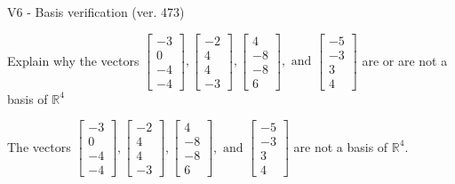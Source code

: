 \begin{exercise}
  \begin{exerciseTitle}V6 - Basis verification (ver. 473)\end{exerciseTitle}
  \begin{exerciseStatement}
    Explain why the vectors \(\left[\begin{array}{r}
-3 \\
0 \\
-4 \\
-4
\end{array}\right] , \left[\begin{array}{r}
-2 \\
4 \\
4 \\
-3
\end{array}\right] , \left[\begin{array}{r}
4 \\
-8 \\
-8 \\
6
\end{array}\right] , \text{ and } \left[\begin{array}{r}
-5 \\
-3 \\
3 \\
4
\end{array}\right]\) are or are not a basis of \(\mathbb{R}^4\)	


  \end{exerciseStatement}
  \begin{exerciseAnswer}
   The vectors \(\left[\begin{array}{r}
-3 \\
0 \\
-4 \\
-4
\end{array}\right] , \left[\begin{array}{r}
-2 \\
4 \\
4 \\
-3
\end{array}\right] , \left[\begin{array}{r}
4 \\
-8 \\
-8 \\
6
\end{array}\right] , \text{ and } \left[\begin{array}{r}
-5 \\
-3 \\
3 \\
4
\end{array}\right]\) 
  	 are not  a basis of \(\mathbb{R}^4\).
  


  \end{exerciseAnswer}
\end{exercise}